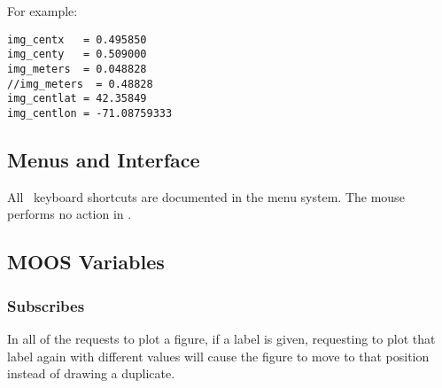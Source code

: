 For example:
\scriptsize
\begin{verbatim}
img_centx   = 0.495850  
img_centy   = 0.509000
img_meters  = 0.048828
//img_meters  = 0.48828
img_centlat = 42.35849
img_centlon = -71.08759333
\end{verbatim}
\normalsize

\subsection{Menus and Interface}
All \pmv\ keyboard shortcuts are documented in the menu system.  The mouse performs no action in \pmv.

\subsection{MOOS Variables}
\subsubsection{Subscribes}
In all of the requests to plot a figure, if a label is given, requesting to plot that label again with different values will cause the figure to move to that position instead of drawing a duplicate.

